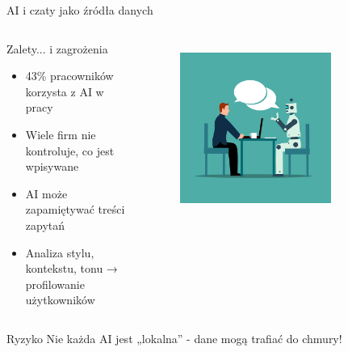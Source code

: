 \begin{frame}{AI i czaty jako źródła danych}
\begin{columns}[c]
    \begin{block}{Zalety... i zagrożenia}
        \begin{itemize}
          \item 43\% pracowników korzysta z AI w pracy
          \item Wiele firm nie kontroluje, co jest wpisywane
          \item AI może zapamiętywać treści zapytań
          \item Analiza stylu, kontekstu, tonu → profilowanie użytkowników
        \end{itemize}
        \end{block}
    \centering
    \begin{figure}
        \centering
        \includegraphics[width=0.75\textwidth]{images/interview.png}
        \label{fig:interview}
    \end{figure}    
\end{columns}
\pause        
\begin{alertblock}{Ryzyko}
    Nie każda AI jest „lokalna” - dane mogą trafiać do chmury!
    \end{alertblock}
\end{frame}
